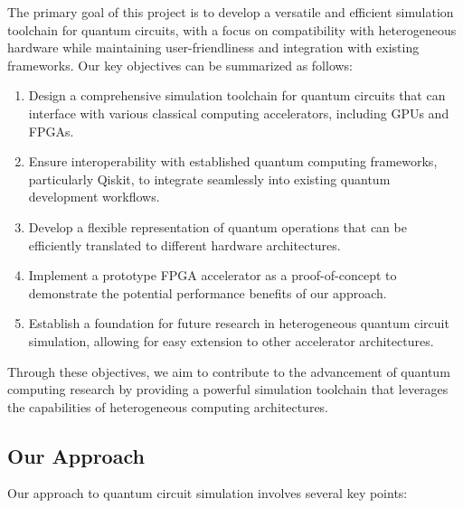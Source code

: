 \documentclass[12pt,oneside,a4paper]{article}
\begin{document}
The primary goal of this project is to develop a versatile and efficient simulation toolchain for quantum circuits, with a focus on compatibility with heterogeneous hardware while maintaining user-friendliness and integration with existing frameworks. Our key objectives can be summarized as follows:

\begin{enumerate}
    \item Design a comprehensive simulation toolchain for quantum circuits that can interface with various classical computing accelerators, including GPUs and FPGAs.
    \item Ensure interoperability with established quantum computing frameworks, particularly Qiskit, to integrate seamlessly into existing quantum development workflows.
    \item Develop a flexible representation of quantum operations that can be efficiently translated to different hardware architectures.
    \item Implement a prototype FPGA accelerator as a proof-of-concept to demonstrate the potential performance benefits of our approach.
    \item Establish a foundation for future research in heterogeneous quantum circuit simulation, allowing for easy extension to other accelerator architectures.
\end{enumerate}

Through these objectives, we aim to contribute to the advancement of quantum computing research by providing a powerful simulation toolchain that leverages the capabilities of heterogeneous computing architectures.

\subsection{Our Approach}

Our approach to quantum circuit simulation involves several key points:
\end{document}
